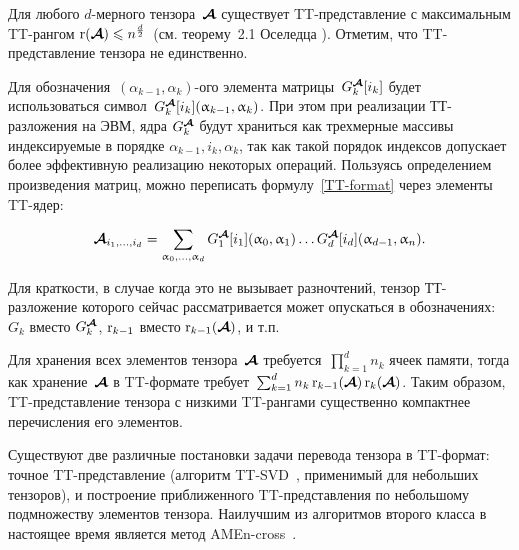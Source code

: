 Для любого $d$-мерного тензора~$\boldsymbol{\mathcal{A}}$ существует TT\hyp{}представление с максимальным TT\hyp{}рангом $\operatorname{r}(\boldsymbol{\mathcal{A}}) \leqslant n^{\frac{d}{2}}$~(см. теорему~2.1 Оселедца \cite{oseledets2011ttMain}). Отметим, что TT\hyp{}представление тензора не единственно.


Для обозначения~$(\alpha_{k-1}, \alpha_{k})$-ого элемента матрицы~$G_k^{\boldsymbol{\mathcal{A}}}[i_k]$ будет использоваться символ~$G_k^{\boldsymbol{\mathcal{A}}}[i_k](\upalpha_{k-1}, \upalpha_{k})$. При этом при реализации ТТ-разложения на ЭВМ, ядра $G_k^{\boldsymbol{\mathcal{A}}}$ будут храниться как трехмерные массивы индексируемые в порядке $\alpha_{k-1}, i_k, \alpha_{k}$, так как такой порядок индексов допускает более эффективную реализацию некоторых операций. 
Пользуясь определением произведения матриц, можно переписать формулу~\eqref{TT-format} через элементы TT\hyp{}ядер:

\begin{equation}
	\label{TT-format-sum}
	\boldsymbol{\mathcal{A}}_{i_1, \ldots, i_d} =
	\sum_{\upalpha_0, \ldots, \upalpha_d} G^{\boldsymbol{\mathcal{A}}}_1[i_1](\upalpha_0, \upalpha_1) \ldots G^{\boldsymbol{\mathcal{A}}}_d[i_d](\upalpha_{d-1}, \upalpha_n).
\end{equation}

Для краткости, в случае когда это не вызывает разночтений, тензор ТТ-разложение которого сейчас рассматривается может опускаться в обозначениях: $G_k$ вместо $G_k^{\boldsymbol{\mathcal{A}}}$, $\operatorname{r}_{k-1}$ вместо $\operatorname{r}_{k-1}(\boldsymbol{\mathcal{A}})$, и т.п.

Для хранения всех элементов тензора~$\boldsymbol{\mathcal{A}}$ требуется~$\prod_{k=1}^d n_k$ ячеек памяти, тогда как хранение~$\boldsymbol{\mathcal{A}}$ в TT\hyp{}формате требует~$\sum_{k=1}^d n_k \operatorname{r}_{k-1}(\boldsymbol{\mathcal{A}}) \operatorname{r}_{k}(\boldsymbol{\mathcal{A}})$. Таким образом, TT\hyp{}представление тензора с низкими TT\hyp{}рангами существенно компактнее перечисления его элементов.

Существуют две различные постановки задачи перевода тензора в TT\hyp{}формат: точное TT\hyp{}представление (алгоритм TT-SVD~\cite{oseledets2011ttMain}, применимый для небольших тензоров), и построение приближенного TT\hyp{}представления по небольшому подмножеству элементов тензора. Наилучшим из алгоритмов второго класса в настоящее время является метод AMEn-cross~\cite{dolgov2013amenCross}.

